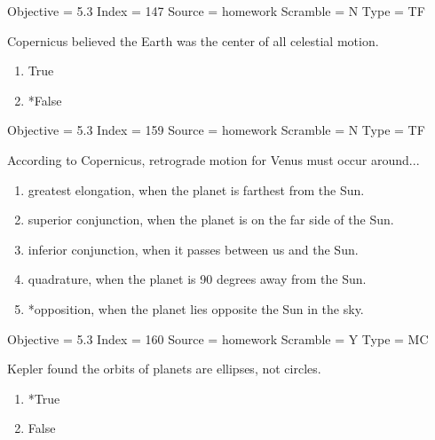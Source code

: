 \documentclass[11pt]{article}
\begin{document}
\begin{enumerate}
\begin{minipage}{\textwidth}
\begin{minipage}{\textwidth}
Objective = 5.3
Index = 147
Source = homework
Scramble = N
Type = TF
\end{minipage}
\end{minipage}
\vskip 0.20in

\begin{minipage}{\textwidth}
\begin{minipage}{\textwidth}
\item Copernicus believed the Earth was the center of all celestial motion.
\begin{multicols}{3}
\begin{enumerate} 
\setlength{\itemsep}{1pt} 
\setlength{\parskip}{0pt} 
\setlength{\parsep}{0pt}
\setlength{\multicolsep}{1pt} 
\item True
\item *False
\end{enumerate} 
\vfill 
\end{multicols}

Objective = 5.3
Index = 159
Source = homework
Scramble = N
Type = TF
\end{minipage}
\end{minipage}
\vskip 0.20in

\begin{minipage}{\textwidth}
\begin{minipage}{\textwidth}
\item According to Copernicus, retrograde motion for Venus must occur around...
\begin{enumerate} 
\setlength{\itemsep}{1pt} 
\setlength{\parskip}{0pt} 
\setlength{\parsep}{0pt}
\setlength{\multicolsep}{1pt} 
\item greatest elongation, when the planet is farthest from the Sun.
\item superior conjunction, when the planet is on the far side of the Sun.
\item inferior conjunction, when it passes between us and the Sun.
\item quadrature, when the planet is 90 degrees away from the Sun.
\item *opposition, when the planet lies opposite the Sun in the sky.
\end{enumerate} 
Objective = 5.3
Index = 160
Source = homework
Scramble = Y
Type = MC
\end{minipage}
\end{minipage}
\vskip 0.20in

\begin{minipage}{\textwidth}
\begin{minipage}{\textwidth}
\item Kepler found the orbits of planets are ellipses, not circles.
\begin{multicols}{3}
\begin{enumerate} 
\setlength{\itemsep}{1pt} 
\setlength{\parskip}{0pt} 
\setlength{\parsep}{0pt}
\setlength{\multicolsep}{1pt} 
\item *True
\item False
\end{enumerate} 
\vfill 
\end{multicols}


\end{minipage}
\end{minipage}
\end{enumerate}
\end{document}
